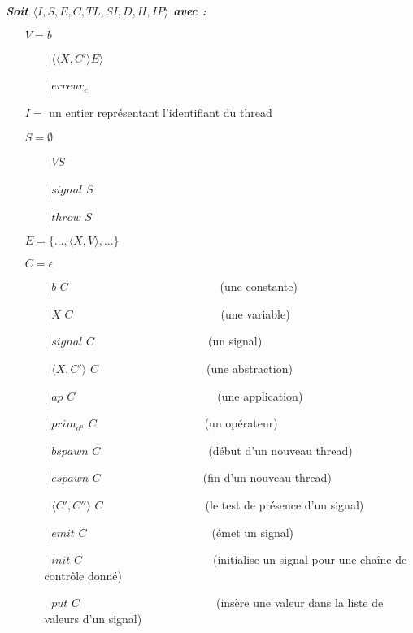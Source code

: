 \documentclass[10pt,a4paper]{article}
\begin{document}
				\textbf{\textit{Soit $\langle I,S,E,C,TL,SI,D,H,IP\rangle$ avec :}}
				
				\begin{itemize}
					\item[] $V = b$	
					\begin{itemize}
						\item[|] $\langle\langle X,C' \rangle E\rangle$
						\item[|] $erreur_{e}$
					\end{itemize}
					\item[] $I =$ un entier représentant l'identifiant du thread
					\item[] $S =  \emptyset$ 
					\begin{itemize}
						\item[|] $V S$
						\item[|] $signal$ $S$
						\item[|] $throw$ $S$
					\end{itemize}
					\item[] $E = \{...,\langle X,V\rangle,...\}$
					\item[] $C = \epsilon$
					\begin{itemize}
						\item[|] $b$ $C$~~~~~~~~~~~~~~~~~~~~~~~~~~    (une constante)
						\item[|] $X$ $C$~~~~~~~~~~~~~~~~~~~~~~~~~~(une variable)
						\item[|] $signal$ $C$~~~~~~~~~~~~~~~~~~~~(un signal)
						\item[|] $\langle X,C'\rangle$ $C$~~~~~~~~~~~~~~~~~~~(une abstraction)
						\item[|] $ap$ $C$~~~~~~~~~~~~~~~~~~~~~~~~~(une application)
						\item[|] $prim_{o^{n}}$ $C$~~~~~~~~~~~~~~~~~~~(un opérateur)
						\item[|] $bspawn$ $C$~~~~~~~~~~~~~~~~~~~(début d'un nouveau thread)
						\item[|] $espawn$ $C$~~~~~~~~~~~~~~~~~~(fin d'un nouveau thread)
						\item[|] $\langle C',C''\rangle$ $C$~~~~~~~~~~~~~~~~~~(le test de présence d'un signal)
						\item[|] $emit$ $C$~~~~~~~~~~~~~~~~~~~~~~(émet un signal)
						\item[|] $init$ $C$~~~~~~~~~~~~~~~~~~~~~~~(initialise un signal pour une chaîne de contrôle donné)
						\item[|] $put$ $C$~~~~~~~~~~~~~~~~~~~~~~~~(insère une valeur dans la liste de valeurs d'un signal)

\end{itemize}
\end{itemize}
\end{document}
